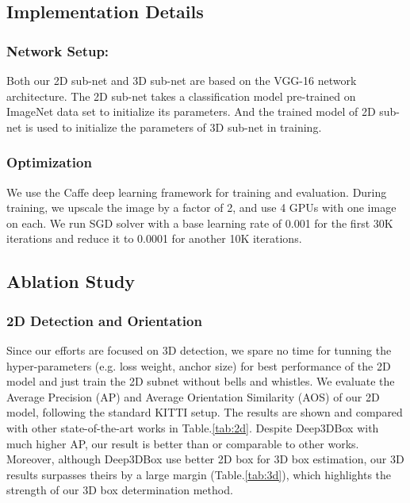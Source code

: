 \documentclass[10pt,twocolumn,letterpaper]{article}
\begin{document}
\subsection{Implementation Details}

\subsubsection{Network Setup:}
Both our 2D sub-net and 3D sub-net are based on the VGG-16 \cite{vgg} network architecture. The 2D sub-net takes a classification model pre-trained on ImageNet data set to initialize its parameters. And the trained model of 2D sub-net is used to initialize the parameters of 3D sub-net in training.

\subsubsection{Optimization}
We use the Caffe deep learning framework \cite{caffe} for training and evaluation. During training, we upscale the image by a factor of 2, and use 4 GPUs with one image on each. We run SGD solver with a base learning rate of 0.001 for the first 30K iterations and reduce it to 0.0001 for another 10K iterations.


\subsection{Ablation Study}

\subsubsection{2D Detection and Orientation}
Since our efforts are focused on 3D detection, we spare no time for tunning the hyper-parameters (e.g. loss weight, anchor size) for best performance of the 2D model and just train the 2D subnet without bells and whistles. 
We evaluate the Average Precision (AP) and Average Orientation Similarity (AOS) of our 2D model, following the standard KITTI setup.
The results are shown and compared with other state-of-the-art works in Table.\ref{tab:2d}.
Despite Deep3DBox \cite{deep3dbox} with much higher AP, our result is better than or comparable to other works. Moreover, although Deep3DBox use better 2D box for 3D box estimation, our 3D results surpasses theirs by a large margin (Table.\ref{tab:3d}), which highlights the strength of our 3D box determination method.
\end{document}

